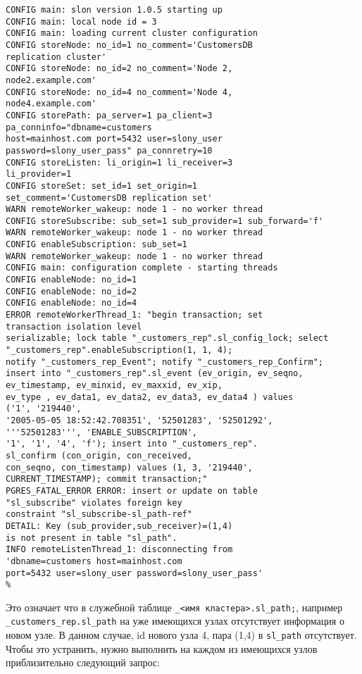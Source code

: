 \begin{lstlisting}[label=lst:slony17,caption=Устранение неисправностей]
%slon customers_rep "dbname=customers user=slony_user"
CONFIG main: slon version 1.0.5 starting up
CONFIG main: local node id = 3
CONFIG main: loading current cluster configuration
CONFIG storeNode: no_id=1 no_comment='CustomersDB
replication cluster'
CONFIG storeNode: no_id=2 no_comment='Node 2,
node2.example.com'
CONFIG storeNode: no_id=4 no_comment='Node 4,
node4.example.com'
CONFIG storePath: pa_server=1 pa_client=3
pa_conninfo="dbname=customers
host=mainhost.com port=5432 user=slony_user
password=slony_user_pass" pa_connretry=10
CONFIG storeListen: li_origin=1 li_receiver=3
li_provider=1
CONFIG storeSet: set_id=1 set_origin=1
set_comment='CustomersDB replication set'
WARN remoteWorker_wakeup: node 1 - no worker thread
CONFIG storeSubscribe: sub_set=1 sub_provider=1 sub_forward='f'
WARN remoteWorker_wakeup: node 1 - no worker thread
CONFIG enableSubscription: sub_set=1
WARN remoteWorker_wakeup: node 1 - no worker thread
CONFIG main: configuration complete - starting threads
CONFIG enableNode: no_id=1
CONFIG enableNode: no_id=2
CONFIG enableNode: no_id=4
ERROR remoteWorkerThread_1: "begin transaction; set
transaction isolation level
serializable; lock table "_customers_rep".sl_config_lock; select
"_customers_rep".enableSubscription(1, 1, 4);
notify "_customers_rep_Event"; notify "_customers_rep_Confirm";
insert into "_customers_rep".sl_event (ev_origin, ev_seqno,
ev_timestamp, ev_minxid, ev_maxxid, ev_xip,
ev_type , ev_data1, ev_data2, ev_data3, ev_data4 ) values
('1', '219440',
'2005-05-05 18:52:42.708351', '52501283', '52501292',
'''52501283''', 'ENABLE_SUBSCRIPTION',
'1', '1', '4', 'f'); insert into "_customers_rep".
sl_confirm (con_origin, con_received,
con_seqno, con_timestamp) values (1, 3, '219440',
CURRENT_TIMESTAMP); commit transaction;"
PGRES_FATAL_ERROR ERROR: insert or update on table
"sl_subscribe" violates foreign key
constraint "sl_subscribe-sl_path-ref"
DETAIL: Key (sub_provider,sub_receiver)=(1,4)
is not present in table "sl_path".
INFO remoteListenThread_1: disconnecting from
'dbname=customers host=mainhost.com
port=5432 user=slony_user password=slony_user_pass'
%
\end{lstlisting}

Это означает что в служебной таблице \lstinline!_<имя кластера>.sl_path;!, например \lstinline!_customers_rep.sl_path! на уже имеющихся узлах отсутствует информация о новом узле. В данном случае, id нового узла 4, пара (1,4) в \lstinline!sl_path! отсутствует. Чтобы это устранить, нужно выполнить на каждом из имеющихся узлов приблизительно следующий запрос:


